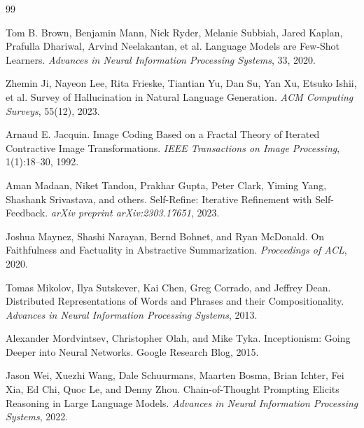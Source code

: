 \documentclass[11pt]{article}
\begin{document}
\begin{thebibliography}{99}

Tom B. Brown, Benjamin Mann, Nick Ryder, Melanie Subbiah, Jared Kaplan, Prafulla Dhariwal, Arvind Neelakantan, et al.
\newblock Language Models are Few-Shot Learners.
\newblock \emph{Advances in Neural Information Processing Systems}, 33, 2020.

Zhemin Ji, Nayeon Lee, Rita Frieske, Tiantian Yu, Dan Su, Yan Xu, Etsuko Ishii, et al.
\newblock Survey of Hallucination in Natural Language Generation.
\newblock \emph{ACM Computing Surveys}, 55(12), 2023.

Arnaud E. Jacquin.
\newblock Image Coding Based on a Fractal Theory of Iterated Contractive Image Transformations.
\newblock \emph{IEEE Transactions on Image Processing}, 1(1):18--30, 1992.

Aman Madaan, Niket Tandon, Prakhar Gupta, Peter Clark, Yiming Yang, Shashank Srivastava, and others.
\newblock Self-Refine: Iterative Refinement with Self-Feedback.
\newblock \emph{arXiv preprint arXiv:2303.17651}, 2023.

Joshua Maynez, Shashi Narayan, Bernd Bohnet, and Ryan McDonald.
\newblock On Faithfulness and Factuality in Abstractive Summarization.
\newblock \emph{Proceedings of ACL}, 2020.

Tomas Mikolov, Ilya Sutskever, Kai Chen, Greg Corrado, and Jeffrey Dean.
\newblock Distributed Representations of Words and Phrases and their Compositionality.
\newblock \emph{Advances in Neural Information Processing Systems}, 2013.

Alexander Mordvintsev, Christopher Olah, and Mike Tyka.
\newblock Inceptionism: Going Deeper into Neural Networks.
\newblock Google Research Blog, 2015.

Jason Wei, Xuezhi Wang, Dale Schuurmans, Maarten Bosma, Brian Ichter, Fei Xia, Ed Chi, Quoc Le, and Denny Zhou.
\newblock Chain-of-Thought Prompting Elicits Reasoning in Large Language Models.
\newblock \emph{Advances in Neural Information Processing Systems}, 2022.

\end{thebibliography}
\end{document}
